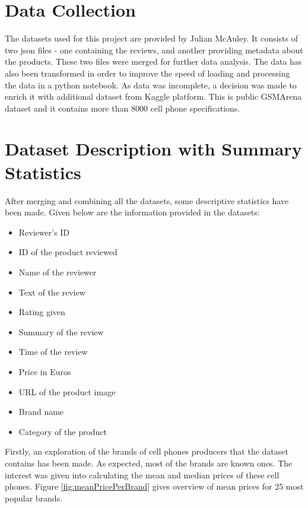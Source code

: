 \documentclass[11pt]{article}
\begin{document}
  
  \section{Data Collection}
  The datasets used for this project are provided by Julian McAuley. It consists of two json files - one containing the reviews, and another providing metadata about the products. These two files were merged for further data analysis. The data has also been transformed in order to improve the speed of loading and processing the data in a python notebook. As data was incomplete, a decision was made to enrich it with additional dataset from Kaggle platform. This is public GSMArena dataset and it contains more than 8000 cell phone specifications.
  
  
  \section{Dataset Description with Summary Statistics}
  After merging and combining all the datasets, some descriptive statistics have been made. Given below are the information provided in the datasets:
  
  \begin{itemize}[noitemsep]
    \item Reviewer's ID
    \item ID of the product reviewed
    \item Name of the reviewer
    \item Text of the review
    \item Rating given
    \item Summary of the review
    \item Time of the review
    \item Price in Euros
    \item URL of the product image
    \item Brand name
    \item Category of the product
  \end{itemize}
  
  Firstly, an exploration of the brands of cell phones producers that the dataset contains has been made. As expected, most of the brands are known ones. The interest was given into calculating the mean and median prices of these cell phones. Figure \ref{fig:meanPricePerBrand} gives overview of mean prices for 25 most popular brands.   
  
\end{document}
